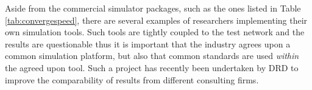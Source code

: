 Aside from the commercial simulator packages, such as the ones listed in Table \ref{tab:convergespeed}, there are several examples of researchers implementing their own simulation tools. Such tools are tightly coupled to the test network and the results are questionable thus it is important that the industry agrees upon a common simulation platform, but also that common standards are used \textit{within} the agreed upon tool. Such a project has recently been undertaken by DRD to improve the comparability of results from different consulting firms.

